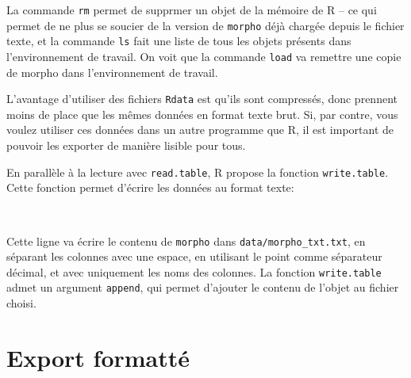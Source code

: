 \noindent La commande \texttt{rm} permet de supprmer un objet de la mémoire de R -- ce qui permet de ne plus se soucier de la version de \texttt{morpho} déjà chargée depuis le fichier texte,
et la commande \texttt{ls} fait une liste de tous les objets présents dans l'environnement de travail.
On voit que la commande \texttt{load} va remettre une copie de morpho dans l'environnement de travail.

L'avantage d'utiliser des fichiers \texttt{Rdata} est qu'ils sont compressés, donc prennent moins de place que les mêmes données en format texte brut.
Si, par contre, vous voulez utiliser ces données dans un autre programme que R, il est important de pouvoir les exporter de manière lisible pour tous.

En parallèle à la lecture avec \texttt{read.table}, R propose la fonction \texttt{write.table}.
Cette fonction permet d'écrire les données au format texte:

\begin{knitrout}
\color{fgcolor}\begin{kframe}
\begin{flushleft}
\ttfamily\noindent
{}\hlkeyword{(}\hlkeyword{,}{\ }\hlargument{=}{\ }\hlkeyword{,}{\ }\hlargument{=}{\ }\hlkeyword{,}{\ }\hlargument{=}{\ }\hlkeyword{,}\hspace*{\fill}\\
\hlstd{}{\ }{\ }{\ }{\ }\hlargument{=}{\ }\hlkeyword{,}{\ }\hlargument{=}{\ }\hlkeyword{)}\mbox{}
\normalfont
\end{flushleft}
\end{kframe}
\end{knitrout}


\noindent Cette ligne va écrire le contenu de \texttt{morpho} dans \texttt{data/morpho\_txt.txt}, en séparant les colonnes avec une espace, en utilisant le point comme
séparateur décimal, et avec uniquement les noms des colonnes.
La fonction \texttt{write.table} admet un argument \texttt{append}, qui permet d'ajouter le contenu de l'objet au fichier choisi.

\section{Export formatté}

